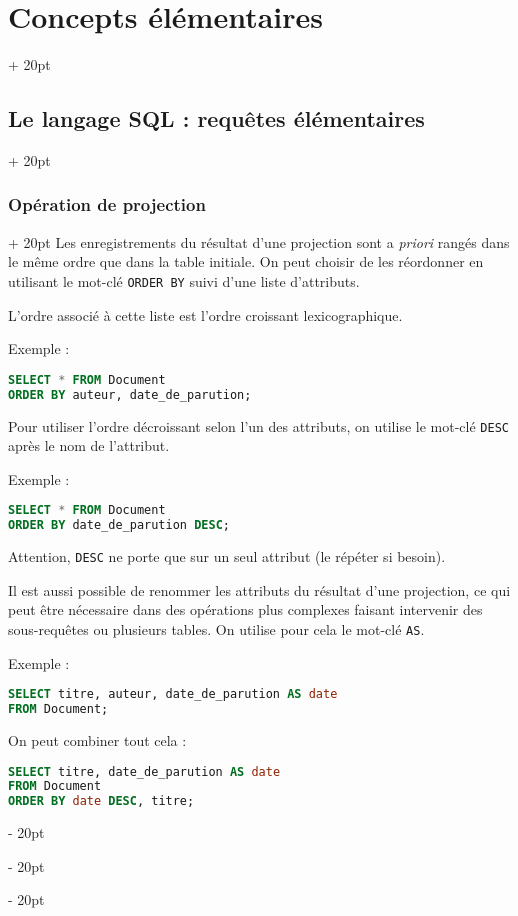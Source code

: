 \documentclass[a4paper, 12pt, twoside]{article}
\newcommand{\ind}[1][20pt]{\advance\leftskip + #1}
\newcommand{\deind}[1][20pt]{\advance\leftskip - #1}
\newenvironment{indt}[2][20pt]{#2 \par \ind[#1]}{\par \deind} %
\begin{document}
\begin{indt}{\section{Concepts élémentaires}}
\begin{indt}{\subsection{Le langage SQL : requêtes élémentaires}}
\begin{indt}{\subsubsection{Opération de projection}}
               Les enregistrements du résultat d'une projection sont a \textit{priori} rangés dans le même ordre que dans la table initiale. On peut choisir de les réordonner en utilisant le mot-clé \texttt{ORDER BY} suivi d'une liste d'attributs.
               
               L'ordre associé à cette liste est l'ordre croissant lexicographique.
               
               Exemple :
               
                \begin{lstlisting}[language=SQL, xleftmargin=80pt]
SELECT * FROM Document
ORDER BY auteur, date_de_parution;\end{lstlisting}
                
                Pour utiliser l'ordre décroissant selon l'un des attributs, on utilise le mot-clé \texttt{DESC} après le nom de l'attribut.
                
                Exemple :
                
                \begin{lstlisting}[language=SQL, xleftmargin=80pt]
SELECT * FROM Document
ORDER BY date_de_parution DESC;\end{lstlisting}
                
                Attention, \texttt{DESC} ne porte que sur un seul attribut (le répéter si besoin).
                
                \vspace{12pt}
                
                Il est aussi possible de renommer les attributs du résultat d'une projection, ce qui peut être nécessaire dans des opérations plus complexes faisant intervenir des sous-requêtes ou plusieurs tables. On utilise pour cela le mot-clé \texttt{AS}.
                
                Exemple :
                
                \begin{lstlisting}[language=SQL, xleftmargin=80pt]
SELECT titre, auteur, date_de_parution AS date
FROM Document;\end{lstlisting}
                
                On peut combiner tout cela :
                
                \begin{lstlisting}[language=SQL, xleftmargin=80pt]
SELECT titre, date_de_parution AS date
FROM Document
ORDER BY date DESC, titre;\end{lstlisting}
            \end{indt}


\end{indt}
\end{indt}
\end{document}
